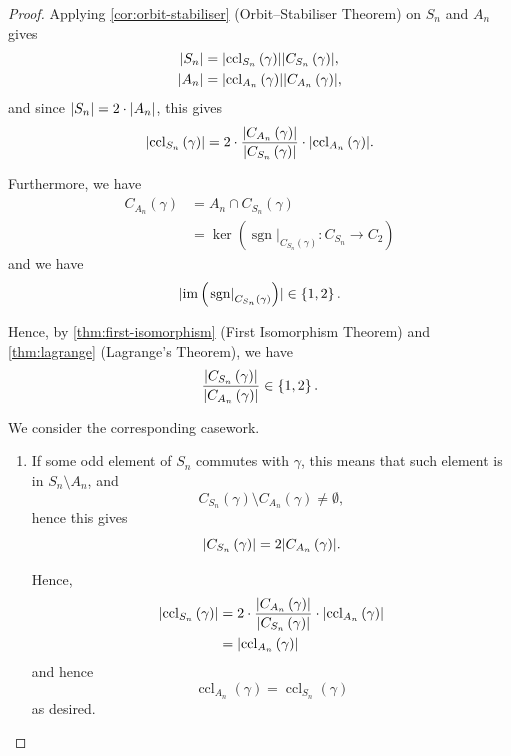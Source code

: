 \documentclass{article}
\theoremstyle{definition}
\theoremstyle{remark}
\DeclarePairedDelimiter{\abs}{\lvert}{\rvert}
\newcommand{\pqty}[1]{\left(#1\right)}
\newcommand{\Bqty}[1]{\left\{#1\right\}}
\newcommand{\functiondomain}[3]{#1:#2\to #3}
\newcommand{\ccl}{\operatorname{ccl}}
\newcommand{\img}{\operatorname{im}}
\newcommand{\sign}{\operatorname{sgn}}
\newcommand{\rightbar}[1]{\left.#1\right|}
\begin{document}
\begin{proof}
    Applying \autoref{cor:orbit-stabiliser} (Orbit--Stabiliser Theorem) on \(S_n\) and \(A_n\) gives
    \begin{align*}
        \abs{S_n} &= \abs{\ccl_{S_n} \pqty{\gamma}} \abs{C_{S_n} \pqty{\gamma}}, \\
        \abs{A_n} &= \abs{\ccl_{A_n} \pqty{\gamma}} \abs{C_{A_n} \pqty{\gamma}},
    \end{align*}
    and since \(\abs{S_n} = 2 \cdot \abs{A_n}\), this gives
    \[
        \abs{\ccl_{S_n} \pqty{\gamma}} = 2 \cdot \frac{\abs{C_{A_n} \pqty{\gamma}}}{\abs{C_{S_n} \pqty{\gamma}}} \cdot \abs{\ccl_{A_n} \pqty{\gamma}}.
    \]

    Furthermore, we have
    \begin{align*}
        C_{A_n} \pqty{\gamma} &= A_n \cap C_{S_n} \pqty{\gamma} \\
        &= \ker\pqty{\functiondomain{\rightbar{\sign}_{C_{S_n} \pqty{\gamma}}}{C_{S_n}}{C_2}}
    \end{align*}
    and we have
    \[
        \abs{\img\pqty{\rightbar{\sign}_{C_{S_n}\pqty{\gamma}}}} \in \Bqty{1, 2}.
    \]

    Hence, by \autoref{thm:first-isomorphism} (First Isomorphism Theorem) and \autoref{thm:lagrange} (Lagrange's Theorem), we have
    \[
        \frac{\abs{C_{S_n} \pqty{\gamma}}}{\abs{C_{A_n} \pqty{\gamma}}} \in \Bqty{1, 2}.
    \]

    We consider the corresponding casework.
    \begin{enumerate}
        \item If some odd element of \(S_n\) commutes with \(\gamma\), this means that such element is in \(S_n \setminus A_n\), and
        \[
            C_{S_n} \pqty{\gamma} \setminus C_{A_n} \pqty{\gamma} \neq \emptyset,
        \]
        hence this gives
        \[
            \abs{C_{S_n} \pqty{\gamma}} = 2 \abs{C_{A_n} \pqty{\gamma}}.
        \]

        Hence,
        \begin{align*}
            \abs{\ccl_{S_n} \pqty{\gamma}} &= 2 \cdot \frac{\abs{C_{A_n} \pqty{\gamma}}}{\abs{C_{S_n} \pqty{\gamma}}} \cdot \abs{\ccl_{A_n} \pqty{\gamma}} \\
            &= \abs{\ccl_{A_n} \pqty{\gamma}}
        \end{align*}
        and hence
        \[
            \ccl_{A_n} \pqty{\gamma} = \ccl_{S_n} \pqty{\gamma}
        \]
        as desired.


\end{enumerate}
\end{proof}
\end{document}
